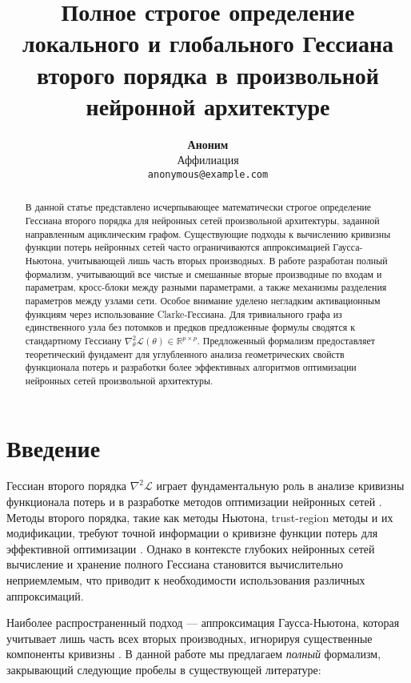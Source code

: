 \documentclass[11pt]{article}
\title{Полное строгое определение локального и глобального Гессиана второго порядка в произвольной нейронной
архитектуре}
\author{
  \textbf{Аноним} \\
  Аффилиация\\
  \texttt{anonymous@example.com} \\
}
\begin{document}
\sloppy
\maketitle

\begin{abstract}
  В данной статье представлено исчерпывающее математически строгое определение Гессиана второго порядка для
  нейронных сетей произвольной архитектуры, заданной направленным ациклическим графом. Существующие подходы к
  вычислению кривизны функции потерь нейронных сетей часто ограничиваются аппроксимацией Гаусса-Ньютона,
  учитывающей лишь часть вторых производных. В работе разработан полный формализм, учитывающий все чистые и
  смешанные вторые производные по входам и параметрам, кросс-блоки между разными параметрами, а также
  механизмы разделения параметров между узлами сети. Особое внимание уделено негладким активационным функциям
  через использование Clarke-Гессиана. Для тривиального графа из единственного узла без потомков и предков
  предложенные формулы сводятся к стандартному Гессиану $\nabla^2_\theta\mathcal
  L(\theta)\in\mathbb{R}^{p\times p}$. Предложенный формализм предоставляет теоретический фундамент для
  углубленного анализа геометрических свойств функционала потерь и разработки более эффективных алгоритмов
  оптимизации нейронных сетей произвольной архитектуры.
\end{abstract}

\section{Введение}
Гессиан второго порядка $\nabla^2\mathcal L$ играет фундаментальную роль в анализе кривизны функционала
потерь и в разработке методов оптимизации нейронных сетей \citep{martens2015optimizing,
pascanu2013revisiting}. Методы второго порядка, такие как методы Ньютона, trust-region методы и их
модификации, требуют точной информации о кривизне функции потерь для эффективной оптимизации
\citep{nocedal2006numerical}. Однако в контексте глубоких нейронных сетей вычисление и хранение полного
Гессиана становится вычислительно неприемлемым, что приводит к необходимости использования различных аппроксимаций.

Наиболее распространенный подход — аппроксимация Гаусса-Ньютона, которая учитывает лишь часть всех вторых
производных, игнорируя существенные компоненты кривизны \citep{schraudolph2002fast, martens2010deep}. В
данной работе мы предлагаем \emph{полный} формализм, закрывающий следующие пробелы в существующей литературе:
\end{document}
